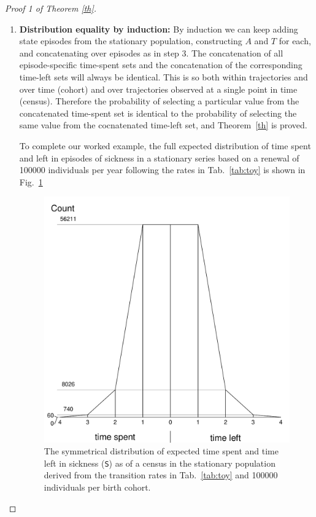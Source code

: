 \documentclass[12pt,oneside,a4paper]{article}
\theoremstyle{definition}
\newcommand{\vb}[1]{\texttt{#1}}
\begin{document}
\begin{proof}[Proof 1 of Theorem \ref{th}]
\begin{enumerate}
\item{\textbf{Distribution equality by induction:}} By induction we can keep adding state episodes from the stationary population, constructing $A$ and $T$ for each, and concatenating over episodes as in step 3. The concatenation of all episode-specific time-spent sets and the concatenation 
of the corresponding time-left sets will always be identical. This is so both within trajectories and over time (cohort) and over trajectories observed at a single point in time (census). Therefore the probability of selecting a particular value from the concatenated time-spent set is identical
to the probability of selecting the same value from the cocnatenated time-left set, and Theorem~\ref{th} is proved.

To complete our worked example, the full expected distribution of time spent and left in episodes of sickness in a stationary series based on a renewal of 100000 individuals per year following the rates in Tab.~\ref{tab:toy} is shown in Fig.~\ref{fig:toydist}

 \begin{figure}[h!]
\centering
\caption{The symmetrical distribution of expected time spent and time left in sickness (\vb{S}) as of a census in the stationary population derived from the transition rates in Tab.~\ref{tab:toy} and 100000 individuals per birth cohort.}
\label{fig:toydist}
\includegraphics[scale=.6]{Figures/ToyDist.pdf}
\end{figure}

\end{enumerate}
\end{proof}
\end{document}
